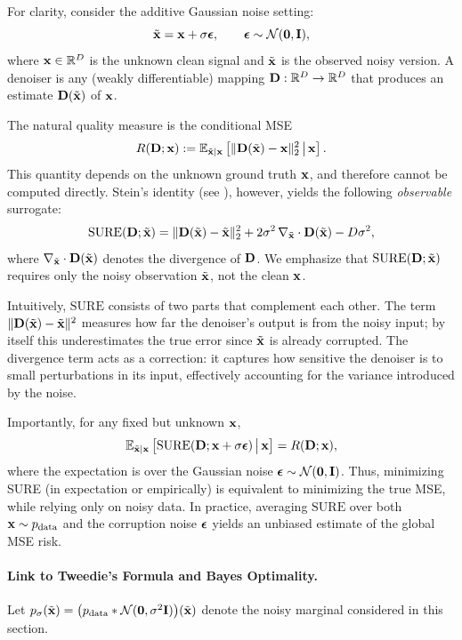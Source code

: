 For clarity, consider the additive Gaussian noise setting:
\[
\tilde{{\mathbf{x}}} = {\mathbf{x}} + \sigma \bm{\epsilon}, 
\qquad \bm{\epsilon} \sim \mathcal{N}(\mathbf{0},{\mathbf{I}}),
\]
where ${\mathbf{x}} \in \mathbb{R}^D$ is the unknown clean signal and $\tilde{{\mathbf{x}}}$ is the observed noisy version. 
A denoiser is any (weakly differentiable) mapping ${\mathbf{D}}:\mathbb{R}^D \to \mathbb{R}^D$ that produces an estimate ${\mathbf{D}}(\tilde{{\mathbf{x}}})$ of ${\mathbf{x}}$.

The natural quality measure is the conditional MSE
\[
R({\mathbf{D}};{\mathbf{x}}) := \mathbb{E}_{\tilde{{\mathbf{x}}}|{\mathbf{x}}}\left[\|{\mathbf{D}}(\tilde{{\mathbf{x}}})-{\mathbf{x}}\|_2^2 \,\big|\, {\mathbf{x}}\right].
\]
This quantity depends on the unknown ground truth ${\mathbf{x}}$, and therefore cannot be computed directly. 
Stein’s identity (see ), however, yields the following \emph{observable} surrogate:
\begin{align}\label{eq:sure-obj}
    \mathrm{SURE}({\mathbf{D}};\tilde{{\mathbf{x}}})
= \|{\mathbf{D}}(\tilde{{\mathbf{x}}})-\tilde{{\mathbf{x}}}\|_2^2
+ 2\sigma^2\,\nabla_{\tilde{{\mathbf{x}}}}\cdot {\mathbf{D}}(\tilde{{\mathbf{x}}})
- D\sigma^2,
\end{align}
where $\nabla_{\tilde{{\mathbf{x}}}}\cdot {\mathbf{D}}(\tilde{{\mathbf{x}}})$ denotes the divergence of ${\mathbf{D}}$. 
We emphasize that $\mathrm{SURE}({\mathbf{D}};\tilde{{\mathbf{x}}})$ requires only the noisy observation $\tilde{{\mathbf{x}}}$, not the clean ${\mathbf{x}}$.

Intuitively, $\mathrm{SURE}$ consists of two parts that complement each other. 
The term $\|{\mathbf{D}}(\tilde{{\mathbf{x}}})-\tilde{{\mathbf{x}}}\|^2$ measures how far the denoiser’s output is from the noisy input; 
by itself this underestimates the true error since $\tilde{{\mathbf{x}}}$ is already corrupted. 
The divergence term acts as a correction: it captures how sensitive the denoiser is to small perturbations in its input, 
effectively accounting for the variance introduced by the noise.


Importantly, for any fixed but unknown ${\mathbf{x}}$,
\[
\mathbb{E}_{\tilde{{\mathbf{x}}}|{\mathbf{x}}}\left[\mathrm{SURE}({\mathbf{D}};{\mathbf{x}}+\sigma{\bm{\epsilon}}) \,\big|\, {\mathbf{x}}\right]
= R({\mathbf{D}};{\mathbf{x}}),
\]
where the expectation is over the Gaussian noise ${\bm{\epsilon}}\sim\mathcal{N}(\bm{0},{\mathbf{I}})$. Thus, minimizing SURE (in expectation or empirically) is equivalent to minimizing the true MSE, 
while relying only on noisy data. 
In practice, averaging $\mathrm{SURE}$ over both ${\mathbf{x}}\sim p_{\mathrm{data}}$ and the corruption noise ${\bm{\epsilon}}$ 
yields an unbiased estimate of the global MSE risk.

\paragraph{Link to Tweedie’s Formula and Bayes Optimality.}
Let $p_\sigma(\tilde{{\mathbf{x}}}) = \big(p_{\mathrm{data}} * \mathcal{N}(\mathbf{0}, \sigma^2 {\mathbf{I}})\big)(\tilde{{\mathbf{x}}})$ denote the noisy marginal considered in this section.


